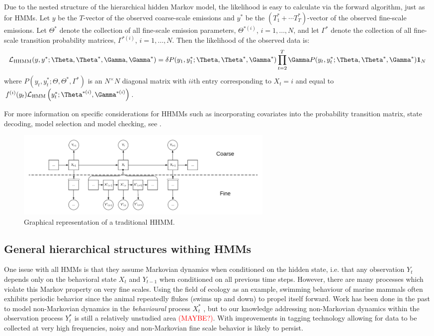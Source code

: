 Due to the nested structure of the hierarchical hidden Markov model, the likelihood is easy to calculate via the forward algorithm, just as for HMMs.
%
Let $y$ be the $T$-vector of the observed coarse-scale emissions and
$y^*$ be the $(T_1^* + \cdots T_T^*)$-vector of the observed fine-scale emissions.
%
Let $\Theta^*$ denote the collection of all fine-scale emission parameters,
$\Theta^{*(i)}$, $i=1,\ldots, N$, and let $\Gamma^*$ denote the collection of all fine-scale transition probability matrices, $\Gamma^{*(i)}$, $i=1,\ldots, N$.
%
Then the likelihood of the observed data is:
%
\[
\calL_{\text{HHMM}}(y,y^*;\Theta,\Theta^*,\Gamma,\Gamma^*) = \delta P(y_1,y_1^*;\Theta,\Theta^*,\Gamma^*) \prod_{t=2}^T \Gamma P(y_t,y_t^*;\Theta,\Theta^*,\Gamma^*) \mathbf{1}_N
\]
%
where $P(y_t,y_t^*;\Theta,\Theta^*,\Gamma^*)$ is an $N^ \times N$ diagonal matrix with $ii$th entry corresponding to $X_t=i$ and equal to 
$f^{(i)}(y_t)\calL_{\text{HMM}}\left(y_t^*;\Theta^{*(i)},
\Gamma^{*(i)}\right)$. 

For more information on specific considerations for HHMMs such as incorporating covariates into the probability transition matrix, state decoding, model selection and model checking, see \citep{Adam:2019}.

\begin{figure}[ht]
	\centering
	\includegraphics[width=5in]{../Plots/HHMM.png}
	\caption{Graphical representation of a traditional HHMM.}
	\label{fig:HHMM}
\end{figure}



\subsection{General hierarchical structures withing HMMs}
\label{subsec:STFT}

One issue with all HMMs is that they assume Markovian dynamics when conditioned on the hidden state, i.e. that any observation $Y_t$ depends only on the behavioral state $X_t$ and $Y_{t-1}$ when conditioned on all previous time steps. However, there are many processes which violate this Markov property on very fine scales. Using the field of ecology as an example, swimming behaviour of marine mammals often exhibits periodic behavior since the animal repeatedly flukes (swims up and down) to propel itself forward. Work has been done in the past to model non-Markovian dynamics in the \textit{behavioural} process $X^*_t$ \citep{Langrock:2012}, but to our knowledge addressing non-Markovian dynamics within the observation process $Y^*_t$ is still a relatively unstudied area \textcolor{red}{(MAYBE?)}. With improvements in tagging technology allowing for data to be collected at very high frequencies, noisy and non-Markovian fine scale behavior is likely to persist.

